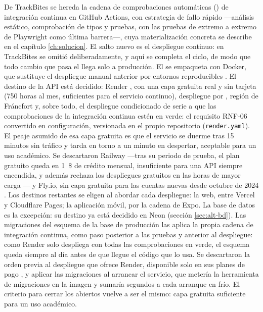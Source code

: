 De TrackBites se hereda la cadena de comprobaciones automáticas () de integración continua en GitHub Actions, con estrategia de fallo rápido —análisis estático, comprobación de tipos y pruebas, con las pruebas de extremo a extremo de Playwright como última barrera—, cuya materialización concreta se describe en el capítulo \ref{ch:solucion}.
El salto nuevo es el despliegue continuo: en TrackBites se omitió deliberadamente, y aquí se completa el ciclo, de modo que todo cambio que pasa el  llega solo a producción.
El  se empaqueta con Docker, que sustituye el despliegue manual anterior por entornos reproducibles \parencite{docker-docs}.
El destino de la \ac{API} está decidido: Render \parencite{render-docs}, con una capa gratuita real y sin tarjeta (750 horas al mes, suficientes para el servicio continuo), despliegue por , región de Fráncfort y, sobre todo, el despliegue condicionado de serie a que las comprobaciones de la integración continua estén en verde: el requisito RNF-06 convertido en configuración, versionada en el propio repositorio (\texttt{render.yaml}).
El peaje asumido de esa capa gratuita es que el servicio se duerme tras 15 minutos sin tráfico y tarda en torno a un minuto en despertar, aceptable para un uso académico.
Se descartaron Railway —tras su periodo de prueba, el plan gratuito queda en 1~\$ de crédito mensual, insuficiente para una \ac{API} siempre encendida, y además rechaza los despliegues gratuitos en las horas de mayor carga \parencite{railway-pricing}— y Fly.io, sin capa gratuita para las cuentas nuevas desde octubre de 2024 \parencite{flyio-pricing}.
Los destinos restantes se eligen al abordar cada despliegue: la web, entre Vercel y Cloudflare Pages; la aplicación móvil, por la cadena de Expo.
La base de datos es la excepción: su destino ya está decidido en Neon (sección \ref{sec:alt-bd}).
Las migraciones del esquema de la base de producción las aplica la propia cadena de integración continua, como paso posterior a las pruebas y anterior al despliegue: como Render solo despliega con todas las comprobaciones en verde, el esquema queda siempre al día antes de que llegue el código que lo usa.
Se descartaron la orden previa al despliegue que ofrece Render, disponible solo en sus planes de pago \parencite{render-deploys}, y aplicar las migraciones al arrancar el servicio, que metería la herramienta de migraciones en la imagen y sumaría segundos a cada arranque en frío.
El criterio para cerrar los abiertos vuelve a ser el mismo: capa gratuita suficiente para un uso académico.

